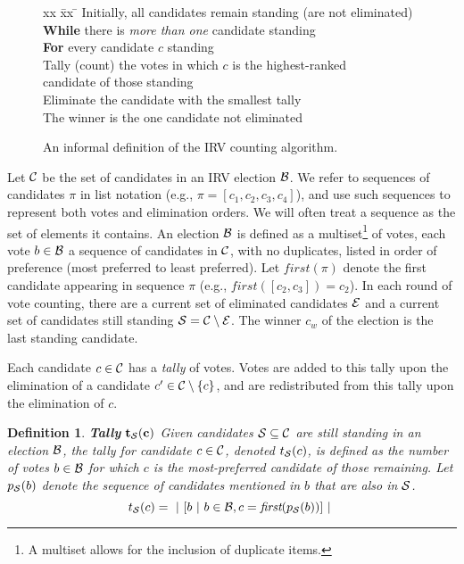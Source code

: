 \documentclass{article}
\newcommand{\tally}{t}
\newcommand{\proj}{p}
\newtheorem{mydef}{Definition}
\newenvironment{definition}{\begin{mydef}\rm}{\end{mydef}}
\newenvironment{ctabbing}%
    {\begin{center}\begin{minipage}{\textwidth}\begin{tabbing}}%
    {\end{tabbing}\end{minipage}\end{center}}
\begin{document}
\begin{figure}[t]
\centering
\begin{framed}
\begin{ctabbing}
xx \= xx \= \kill
Initially, all candidates remain standing (are not eliminated)\\
\textbf{While} there is \textit{more than one} candidate standing \\
\> \textbf{For} every candidate $c$ standing\\
\> \> Tally (count) the votes in which $c$ is the highest-ranked \\
\>\> candidate of those standing\\
 \> Eliminate the candidate with the smallest tally\\
The winner is the one candidate not eliminated
\end{ctabbing}
\vspace{-0.5cm}
\end{framed}
\caption{An informal definition of the IRV counting algorithm.}
\label{alg:IRV}
\end{figure}

Let $\mathcal{C}$ be the set of candidates in an IRV election $\mathcal{B}$. We refer to
sequences of candidates $\pi$ in list notation (e.g., $\pi =
[c_1,c_2,c_3,c_4]$), and use such sequences to represent both votes and
elimination orders. We will often treat a sequence as the set of elements it
contains. An election $\mathcal{B}$ is defined as a multiset\footnote{A multiset
allows for the inclusion of duplicate items.} of votes, each vote $b \in
\mathcal{B}$ a sequence of candidates in $\mathcal{C}$, with no duplicates, listed in
order of preference (most preferred to least preferred). Let
$\mathit{first}(\pi)$ denote the first candidate appearing in sequence $\pi$
(e.g., $\mathit{first}([c_2,c_3]) = c_2$). In each round of vote counting, there are a current set of eliminated candidates $\mathcal{E}$ and a current set of candidates still standing $\mathcal{S} = \mathcal{C} \setminus \mathcal{E}$. The winner $c_w$ of the election is the last standing candidate.

Each candidate $c \in \mathcal{C}$ has a \textit{tally} of votes. Votes are added to this tally upon the elimination of a candidate $c' \in \mathcal{C} \setminus \{c\}$, and are redistributed from this tally upon the elimination of $c$. 

\begin{definition}{\textbf{Tally} $\mathbf{\tally_\stand(c)}$} Given candidates
$\mathcal{S} \subseteq \mathcal{C}$ are still standing in an election $\mathcal{B}$, the
tally for candidate $c \in \mathcal{C}$, denoted $\tally_\stand(c)$, is defined as
the number of votes $b \in \mathcal{B}$ for which $c$ is the most-preferred
candidate of those remaining. Let $\proj_\stand(b)$ denote the sequence of candidates mentioned in $b$ that are also in $\mathcal{S}$. 
\begin{equation}
\tally_\stand(c) = ~|~ [b ~|~ b \in \election, c = \textit{first}(\proj_\stand(b))] ~|~
\end{equation} 
\label{def:Tally}
\end{definition}   
 
\end{document}
